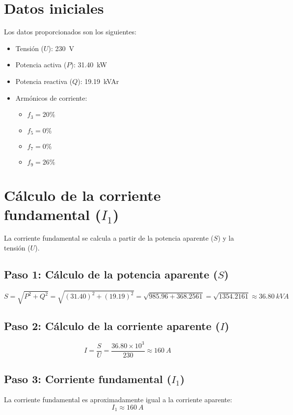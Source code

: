 \documentclass[a4paper,10pt]{article}
\begin{document}
\begin{Form}
\section{Datos iniciales}
Los datos proporcionados son los siguientes:
\begin{itemize}
    \item Tensión (\(U\)): \SI{230}{V}
    \item Potencia activa (\(P\)): \SI{31.40}{kW}
    \item Potencia reactiva (\(Q\)): \SI{19.19}{kVAr}
    \item Armónicos de corriente:
        \begin{itemize}
            \item \(f_3 = 20\%\)
            \item \(f_5 = 0\%\)
            \item \(f_7 = 0\%\)
            \item \(f_9 = 26\%\)
        \end{itemize}
\end{itemize}



\section{Cálculo de la corriente fundamental (\(I_1\))}
La corriente fundamental se calcula a partir de la potencia aparente (\(S\)) y la tensión (\(U\)).




\subsection{Paso 1: Cálculo de la potencia aparente (\(S\))}
\[
S = \sqrt{P^2 + Q^2} = \sqrt{(31.40)^2 + (19.19)^2} = \sqrt{985.96 + 368.2561} = \sqrt{1354.2161} \approx \SI{36.80}{kVA}
\]

\subsection{Paso 2: Cálculo de la corriente aparente (\(I\))}
\[
I = \frac{S}{U} = \frac{36.80 \times 10^3}{230} \approx \SI{160}{A}
\]

\subsection{Paso 3: Corriente fundamental (\(I_1\))}
La corriente fundamental es aproximadamente igual a la corriente aparente:
\[
I_1 \approx \SI{160}{A}
\]


\end{Form}
\end{document}
